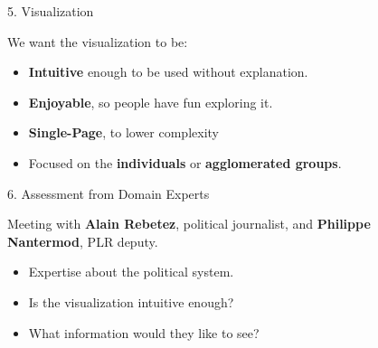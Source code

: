 \documentclass[final]{beamer}
\newlength{\sepwid}
\newlength{\onecolwid}
\newlength{\twocolwid}
\begin{document}
\begin{frame}[t]
\begin{columns}[t]
\begin{column}{\twocolwid}
\begin{columns}[t,totalwidth=\twocolwid]
\begin{column}{\onecolwid}
\end{column} %

\end{columns} %

\end{column} %

\begin{column}{\sepwid}\end{column} %

\begin{column}{\onecolwid} %


\begin{alertblock}{5. Visualization}

We want the visualization to be: 
\begin{itemize}
\item \textbf{Intuitive} enough to be used without explanation.
\item \textbf{Enjoyable}, so people have fun exploring it.
\item \textbf{Single-Page}, to lower complexity
\item Focused on the \textbf{individuals} or \textbf{agglomerated groups}.
\end{itemize}


\end{alertblock}


\begin{alertblock}{6. Assessment from Domain Experts}

Meeting with \textbf{Alain Rebetez}, political journalist, and \textbf{Philippe Nantermod}, PLR deputy.

\begin{itemize}
\item Expertise about the political system.
\item Is the visualization intuitive enough?
\item What information would they like to see?
\end{itemize}




\end{alertblock}
\end{column}
\end{columns}
\end{frame}
\end{document}
